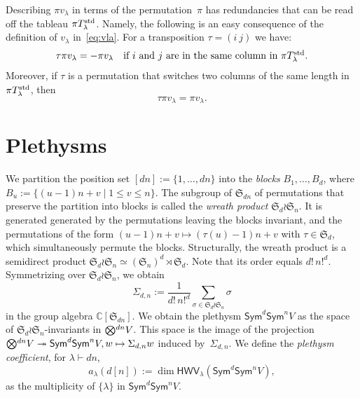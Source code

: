 \documentclass[11pt]{amsart}
\def\C{\mathbb{C}}
\def\Sym{\mathsf{Sym}}
\def\la{\lambda}
\newcommand{\out}{d}
\newcommand{\inn}{n}
\newcommand{\IC}{\ensuremath{\mathbb{C}}}
\newcommand{\aS}{\ensuremath{\mathfrak{S}}}
\newcommand{\tensor}{\smash{\textstyle\bigotimes}}
\newcommand{\HWV}{\mathsf{HWV}}
\numberwithin{equation}{section}
\begin{document}
Describing $\pi v_\la$ in terms of the permutation~$\pi$ has redundancies 
that can be read off the tableau $\pi T^\textup{std}_{\la}$. Namely, the following 
is an easy consequence of the definition of $v_\la$ in~\eqref{eq:vla}. 
For a transposition $\tau=(i \ j)$ we have: 
\begin{equation}\label{eq:transpositioninverse}
 \tau \pi v_\la = -\pi v_\la \quad\mbox{if $i$ and $j$ are in the same column in $\pi T^\textup{std}_{\la}$.}
\end{equation}
Moreover, if $\tau$ is a permutation that switches two columns 
of the same length in $\pi T^\textup{std}_{\la}$, then 
\begin{equation}\label{eq:exchangecols}
 \tau \pi v_\la = \pi v_\la .
\end{equation}

\section{Plethysms}\label{se:plethysms}

We partition the position set 
$[dn] := \{1,\ldots,dn\}$
into the {\em blocks} $B_1,\ldots,B_d$, 
where 
$B_u := \{ (u-1)n +v \mid 1\le v \le n\}$. 
The subgroup of $\aS_{dn}$ of permutations 
that preserve the partition into blocks
is called the {\em wreath product} $\aS_d \wr \aS_n$.
It is generated generated by the permutations 
leaving the blocks invariant,  
and the permutations of the form 
$(u-1)n+v \mapsto (\tau(u) -1) n +v$ with $\tau \in\aS_d$, 
which simultaneously permute the blocks. Structurally, 
the wreath product is a semidirect product 
$\aS_d \wr \aS_n \simeq(\aS_n)^d \rtimes  \aS_d$. 
Note that its order equals $d!\, n!^d$. 
Symmetrizing over $\aS_\out \wr \aS_\inn$, we obtain 
\begin{equation}\label{eq:PROJ}
\Sigma_{d,n} := \frac{1}{d!\, n!^d} \sum_{\sigma \in \aS_d \wr \aS_n} \sigma 
\end{equation}
in the group algebra $\C[\aS_{dn}]$. 
We obtain the plethysm $\Sym^d \Sym^n V$ as the space of 
$\aS_d \wr \aS_n$-invariants in $\tensor^{dn} V$. 
This space is the image of the projection 
$\tensor^{dn} V \twoheadrightarrow \Sym^d\Sym^n V, w\mapsto \Sigma_{d,n} w$ 
induced by~$\Sigma_{d,n}$. 
We define the {\em plethysm coefficient}, for $\la\vdash dn$, 
\begin{equation*}%
 a_\la(d[n]) :=\dim\HWV_\la(\Sym^\out \Sym^\inn V) ,
\end{equation*}
as the multiplicity of $\{\la\}$ in $\Sym^\out \Sym^\inn V$. 
\end{document}
